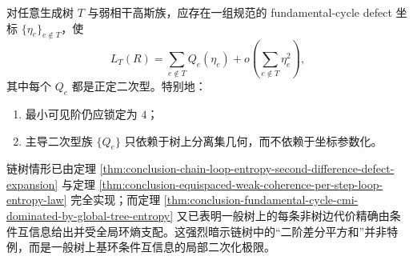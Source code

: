 \begin{conjecture}[一般树上的基环显影加法性]\label{conj:conclusion-general-tree-fundamental-cycle-quadratic-visibility}
对任意生成树 \(T\) 与弱相干高斯族，应存在一组规范的 fundamental-cycle defect 坐标 \(\{\eta_e\}_{e\notin T}\)，使
\[
L_T(R)
=
\sum_{e\notin T}Q_e(\eta_e)
+
o\!\left(\sum_{e\notin T}\eta_e^2\right),
\]
其中每个 \(Q_e\) 都是正定二次型。特别地：
\begin{enumerate}
  \item 最小可见阶仍应锁定为 \(4\)；
  \item 主导二次型族 \(\{Q_e\}\) 只依赖于树上分离集几何，而不依赖于坐标参数化。
\end{enumerate}
链树情形已由定理 \ref{thm:conclusion-chain-loop-entropy-second-difference-defect-expansion} 与定理 \ref{thm:conclusion-equispaced-weak-coherence-per-step-loop-entropy-law} 完全实现；而定理 \ref{thm:conclusion-fundamental-cycle-cmi-dominated-by-global-tree-entropy} 又已表明一般树上的每条非树边代价精确由条件互信息给出并受全局环熵支配。这强烈暗示链树中的“二阶差分平方和”并非特例，而是一般树上基环条件互信息的局部二次化极限。
\end{conjecture}

